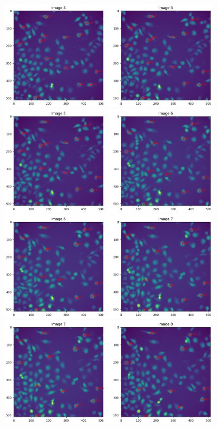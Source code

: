 \documentclass{article}
\begin{document}
\clearpage
\begin{figure}[h!]
\centering
\includegraphics[width=0.75\linewidth]{Report/RImages/Traces_Control/image_5a.png}
\includegraphics[width=0.75\linewidth]{Report/RImages/Traces_Control/image_6a.png}
\includegraphics[width=0.75\linewidth]{Report/RImages/Traces_Control/image_7a.png}
\includegraphics[width=0.75\linewidth]{Report/RImages/Traces_Control/image_8a.png}
\end{figure}
\clearpage
\end{document}
